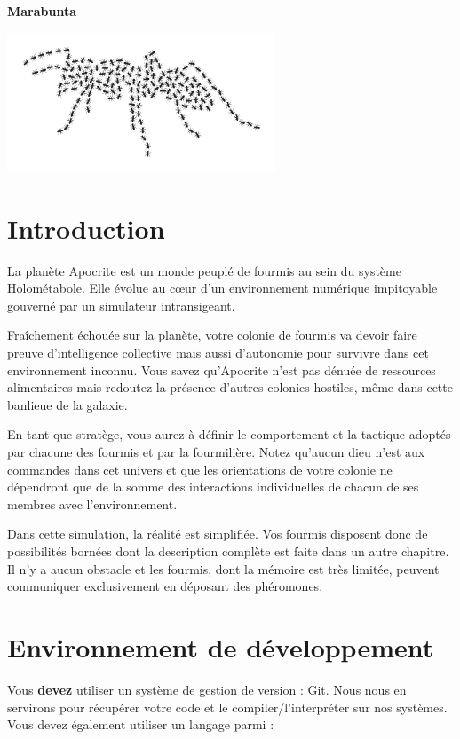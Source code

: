 \documentclass[a4paper, 11pt]{article}
\begin{document}
	\begin{center}
		\LARGE\bfseries
		Marabunta

		\includegraphics[width=8cm]{../documentation/_static/images/logo_marabunta.png}
	\end{center}


	\section{Introduction}

La planète Apocrite est un monde peuplé de fourmis au sein du système
Holométabole. Elle évolue au cœur d'un environnement numérique impitoyable
gouverné par un simulateur intransigeant.

Fraîchement échouée sur la planète, votre colonie de fourmis va devoir faire
preuve d'intelligence collective mais aussi d'autonomie pour survivre dans cet
environnement inconnu. Vous savez qu'Apocrite n'est pas dénuée de ressources
alimentaires mais redoutez la présence d'autres colonies hostiles, même dans
cette banlieue de la galaxie.

En tant que stratège, vous aurez à définir le comportement et la tactique
adoptés par chacune des fourmis et par la fourmilière. Notez qu'aucun dieu n'est
aux commandes dans cet univers et que les orientations de votre colonie ne
dépendront que de la somme des interactions individuelles de chacun de ses
membres avec l'environnement.

Dans cette simulation, la réalité est simplifiée. Vos fourmis disposent donc de
possibilités bornées dont la description complète est faite dans un autre
chapitre. Il n'y a aucun obstacle et les fourmis, dont la mémoire est très
limitée, peuvent communiquer exclusivement en déposant des phéromones.

	\section{Environnement de développement}

Vous \textbf{devez} utiliser un système de gestion de version : Git. Nous nous en
servirons pour récupérer votre code et le compiler/l'interpréter sur nos systèmes.
Vous devez également utiliser un langage parmi :
\end{document}
